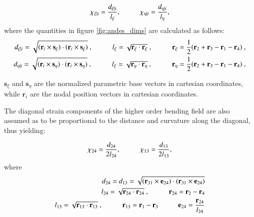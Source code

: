 \begin{equation} 
\chi_{\xi | i} = \frac{d_{\xi | i}}{l_\xi},
\hspace{10mm}
\chi_{\eta | i} = \frac{d_{\eta | i}}{l_\eta},
\label{equation12}
\end{equation}
where the quantities in figure \ref{fig:andes_dims} are calculated as follows:
\begin{align*} 
	d_{\xi | i} = \sqrt{(\mathbf{r}_i \times \mathbf{s_\xi}) \cdot (\mathbf{r}_i \times \mathbf{s_\xi})}\ ,
	\hspace{10mm}
	l_\xi = \sqrt{\mathbf{r_\xi} \cdot \mathbf{r_\xi}}\ ,
	\hspace{10mm} 
	\mathbf{r_\xi} = \frac{1}{2} ( \mathbf{r}_2 + \mathbf{r}_3 - \mathbf{r}_1 - \mathbf{r}_4 )\ , \\
	d_{\eta | i} = \sqrt{(\mathbf{r}_i \times \mathbf{s_\eta}) \cdot (\mathbf{r}_i \times \mathbf{s_\eta})}\ ,
	\hspace{10mm}
	l_\xi = \sqrt{\mathbf{r_\eta} \cdot \mathbf{r_\eta}}\ ,
	\hspace{10mm}
	\mathbf{r_\eta} = \frac{1}{2} ( \mathbf{r}_2 + \mathbf{r}_3 - \mathbf{r}_1 - \mathbf{r}_4 )\ ,
\end{align*}

$\mathbf{s}_\xi$ and $\mathbf{s}_\eta$ are the normalized parametric base vectors in cartesian coordinates, while $\textbf{r}_i$ are the nodal position vectors in cartesian coordinates.

The diagonal strain components of the higher order bending field are also assumed as to be proportional to the distance and curvature along the diagonal, thus yielding:  

\begin{equation} 
\chi_{24} = \frac{d_{24}}{2 l_{24}},
\hspace{10mm}
\chi_{13} = \frac{d_{13}}{2 l_{13}},
\label{equation12chi24}
\end{equation}
where
\begin{align*} 
	d_{24} = d_{13} = \sqrt{(\mathbf{r}_{31} \times \mathbf{e}_{24}) \cdot (\mathbf{r}_{31} \times \mathbf{e}_{24})} \\
	l_{24} = \sqrt{\mathbf{r}_{24} \cdot \mathbf{r}_{24}}\ ,
	\hspace{10mm}
	\mathbf{r}_{24} = \mathbf{r}_2 - \mathbf{r}_4 \\
	l_{13} = \sqrt{\mathbf{r}_{13} \cdot \mathbf{r}_{13}}\ ,
	\hspace{10mm}
	\mathbf{r}_{13} = \mathbf{r}_1 - \mathbf{r}_3
	\hspace{10mm}
	\mathbf{e}_{24} = \frac{\mathbf{r}_{24}}{l_{24}}
\end{align*}

